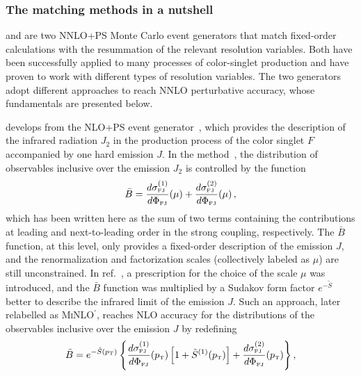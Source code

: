 \documentclass[11pt,a4paper]{article}
\begin{document}
\subsubsection{The matching methods in a nutshell}

\minnlo{} and \GENEVA{} are two NNLO+PS Monte Carlo event generators
that match fixed-order calculations with the resummation of the
relevant resolution variables. Both have been successfully applied to
many processes of color-singlet production and have proven to work
with different types of resolution variables. The two generators adopt
different approaches to reach NNLO perturbative accuracy, whose
fundamentals are presented below.

\minnlo{} develops from the NLO+PS \POWHEG{} event
generator~\cite{Alioli:2010xd}, which provides the description of the
infrared radiation $J_2$ in the production process of the color
singlet $F$ accompanied by one hard emission $J$. In the \POWHEG{}
method~\cite{Frixione:2007vw}, the distribution of observables
inclusive over the emission $J_2$ is controlled by the function
\begin{equation}
  \bar{B} = \frac{d\sigma_{\scriptscriptstyle\rm
      FJ}^{(1)}}{d\Phi_{\scriptscriptstyle\rm FJ}}\!\left(\mu\right) +
  \frac{d\sigma_{\scriptscriptstyle\rm
      FJ}^{(2)}}{d\Phi_{\scriptscriptstyle\rm FJ}}\!\left(\mu\right),
\end{equation}
which has been written here as the sum of two terms containing the
contributions at leading and next-to-leading order in the strong
coupling, respectively. The $\bar{B}$ function, at this level, only
provides a fixed-order description of the emission $J$, and the
renormalization and factorization scales (collectively labeled as
$\mu$) are still unconstrained. In ref.~\cite{Hamilton:2012rf}, a
prescription for the choice of the scale $\mu$ was introduced, and the
$\bar{B}$ function was multiplied by a Sudakov form factor
$e^{-\tilde{S}}$ better to describe the infrared limit of the emission
$J$. Such an approach, later relabelled as {\small
  \textsc{MiNLO$^\prime$}}, reaches NLO accuracy for the distributions
of the observables inclusive over the emission $J$ by redefining
\begin{equation}
  \bar{B} = e^{-\tilde{S}\left(p_{\scriptscriptstyle\rm T}\right)}
  \left\{\frac{d\sigma_{\scriptscriptstyle\rm
      FJ}^{(1)}}{d\Phi_{\scriptscriptstyle\rm
      FJ}}\!\left(p_{\scriptscriptstyle\rm T}\right) \left[1 +
    \tilde{S}^{(1)}\!\left(p_{\scriptscriptstyle\rm T}\right)\right] +
  \frac{d\sigma_{\scriptscriptstyle\rm
      FJ}^{(2)}}{d\Phi_{\scriptscriptstyle\rm
      FJ}}\!\left(p_{\scriptscriptstyle\rm T}\right)\right\},
\end{equation}
\end{document}
